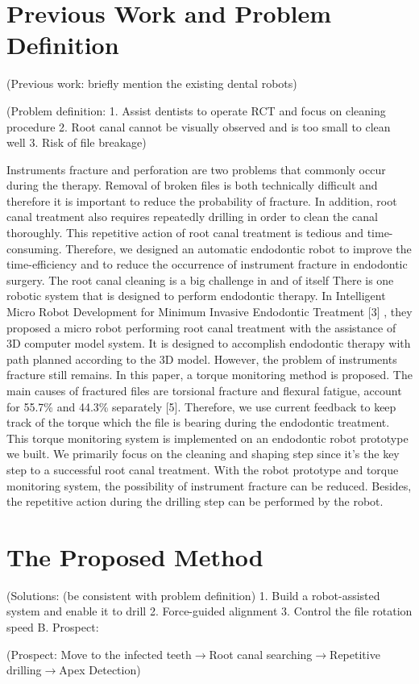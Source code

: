 \section{Previous Work and Problem Definition}
(Previous work: briefly mention the existing dental robots)
\par\noindent
(Problem definition:
1.	Assist dentists to operate RCT and focus on cleaning procedure
2.	Root canal cannot be visually observed and is too small to clean well
3.	Risk of file breakage)		
\par\noindent
Instruments fracture and perforation are two problems that commonly occur during the therapy. Removal of broken files is both technically difficult and therefore it is important to reduce the probability of fracture. In addition, root canal treatment also requires repeatedly drilling in order to clean the canal thoroughly.  This repetitive action of root canal treatment is tedious and time-consuming. Therefore, we designed an automatic endodontic robot to improve the time-efficiency and to reduce the occurrence of instrument fracture in endodontic surgery.
The root canal cleaning is a big challenge in and of itself
There is one robotic system that is designed to perform endodontic therapy. In Intelligent Micro Robot Development for Minimum Invasive Endodontic Treatment [3] , they proposed a micro robot performing root canal treatment with the assistance of 3D computer model system. It is designed to accomplish endodontic therapy with path planned according to the 3D model. However, the problem of instruments fracture still remains. 
In this paper, a torque monitoring method is proposed. The main causes of fractured files are torsional fracture and flexural fatigue, account for 55.7\% and 44.3\% separately [5]. Therefore, we use current feedback to keep track of the torque which the file is bearing during the endodontic treatment. This torque monitoring system is implemented on an endodontic robot prototype we built. We primarily focus on the cleaning and shaping step since it’s the key step to a successful root canal treatment. With the robot prototype and torque monitoring system, the possibility of instrument fracture can be reduced. Besides, the repetitive action during the drilling step can be performed by the robot.			
\section{The Proposed Method}
(Solutions: (be consistent with problem definition)
1.	Build a robot-assisted system and enable it to drill
2.	Force-guided alignment 
3.	Control the file rotation speed
B.	Prospect:
\par\noindent
(Prospect: Move to the infected teeth$\longrightarrow $Root canal searching$\longrightarrow $Repetitive drilling$\longrightarrow $Apex Detection)						
